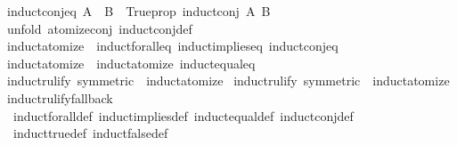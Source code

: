 \begin{isabellebody}
{\isafoldproof}%
%
\isadelimproof
\isanewline
%
\endisadelimproof
\isanewline
{}\isamarkupfalse%
\ induct{\isacharunderscore}{\kern0pt}conj{\isacharunderscore}{\kern0pt}eq{\isacharcolon}{\kern0pt}\ {\isachardoublequoteopen}{\isacharparenleft}{\kern0pt}A\ {\isacharampersand}{\kern0pt}{\isacharampersand}{\kern0pt}{\isacharampersand}{\kern0pt}\ B{\isacharparenright}{\kern0pt}\ {\isasymequiv}\ Trueprop\ {\isacharparenleft}{\kern0pt}induct{\isacharunderscore}{\kern0pt}conj\ A\ B{\isacharparenright}{\kern0pt}{\isachardoublequoteclose}\isanewline
%
\isadelimproof
\ \ %
\endisadelimproof
%
\isatagproof
{}\isamarkupfalse%
\ {\isacharparenleft}{\kern0pt}unfold\ atomize{\isacharunderscore}{\kern0pt}conj\ induct{\isacharunderscore}{\kern0pt}conj{\isacharunderscore}{\kern0pt}def{\isacharparenright}{\kern0pt}%
\endisatagproof
{\isafoldproof}%
%
\isadelimproof
\isanewline
%
\endisadelimproof
\isanewline
{}\isamarkupfalse%
\ induct{\isacharunderscore}{\kern0pt}atomize{\isacharprime}{\kern0pt}\ {\isacharequal}{\kern0pt}\ induct{\isacharunderscore}{\kern0pt}forall{\isacharunderscore}{\kern0pt}eq\ induct{\isacharunderscore}{\kern0pt}implies{\isacharunderscore}{\kern0pt}eq\ induct{\isacharunderscore}{\kern0pt}conj{\isacharunderscore}{\kern0pt}eq\isanewline
{}\isamarkupfalse%
\ induct{\isacharunderscore}{\kern0pt}atomize\ {\isacharequal}{\kern0pt}\ induct{\isacharunderscore}{\kern0pt}atomize{\isacharprime}{\kern0pt}\ induct{\isacharunderscore}{\kern0pt}equal{\isacharunderscore}{\kern0pt}eq\isanewline
{}\isamarkupfalse%
\ induct{\isacharunderscore}{\kern0pt}rulify{\isacharprime}{\kern0pt}\ {\isacharbrackleft}{\kern0pt}symmetric{\isacharbrackright}{\kern0pt}\ {\isacharequal}{\kern0pt}\ induct{\isacharunderscore}{\kern0pt}atomize{\isacharprime}{\kern0pt}\isanewline
{}\isamarkupfalse%
\ induct{\isacharunderscore}{\kern0pt}rulify\ {\isacharbrackleft}{\kern0pt}symmetric{\isacharbrackright}{\kern0pt}\ {\isacharequal}{\kern0pt}\ induct{\isacharunderscore}{\kern0pt}atomize\isanewline
{}\isamarkupfalse%
\ induct{\isacharunderscore}{\kern0pt}rulify{\isacharunderscore}{\kern0pt}fallback\ {\isacharequal}{\kern0pt}\isanewline
\ \ induct{\isacharunderscore}{\kern0pt}forall{\isacharunderscore}{\kern0pt}def\ induct{\isacharunderscore}{\kern0pt}implies{\isacharunderscore}{\kern0pt}def\ induct{\isacharunderscore}{\kern0pt}equal{\isacharunderscore}{\kern0pt}def\ induct{\isacharunderscore}{\kern0pt}conj{\isacharunderscore}{\kern0pt}def\isanewline
\ \ induct{\isacharunderscore}{\kern0pt}true{\isacharunderscore}{\kern0pt}def\ induct{\isacharunderscore}{\kern0pt}false{\isacharunderscore}{\kern0pt}def\isanewline

\end{isabellebody}
